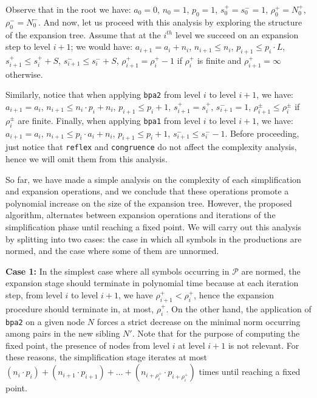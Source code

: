 Observe that in the root we have: $a_0=0$, $n_0=1$, $p_0=1$,
$s_0^+=s_0^-=1$, $\rho_0^+=N_0^+$, $\rho_0^-=N_0^-$. And now, let us proceed
with this analysis by exploring the structure of the expansion tree. Assume 
that at the $i^{th}$ level we succeed on an expansion step to
level $i+1$;
we would have: $a_{i+1}=a_i+n_i$, $n_{i+1}\leq n_i$, 
$p_{i+1}\leq p_i\cdot L$,
$s_{i+1}^+\leq s_i^++S$, $s_{i+1}^-\leq s_i^-+S$, $\rho_{i+1}^+=\rho_i^+-1$ 
if $\rho_i^+$ is finite and  $\rho_{i+1}^+ = \infty$ otherwise.

Similarly, notice that when applying \lstinline{bpa2} from level $i$
to level $i+1$, we have: $a_{i+1}=a_i$, $n_{i+1} \leq n_i\cdot p_i + n_i$,
$p_{i+1} \leq p_i+1$, $s_{i+1}^+=s_i^+$, $s_{i+1}^-=1$, 
$\rho_{i+1}^\pm\leq \rho_i^\pm$ if $\rho_i^\pm$ are finite. 
Finally, when applying \lstinline{bpa1} from level $i$
to level $i+1$, we have: $a_{i+1}=a_i$, $n_{i+1} \leq p_i \cdot a_i+n_i$,
$p_{i+1}\leq p_i+1$, $s_{i+1}^- \leq s_i^- - 1$.
Before proceeding, just notice that \lstinline{reflex} and 
\lstinline{congruence} do not affect the complexity analysis, hence 
we will omit them from this analysis.

So far, we have made a simple analysis on the complexity of each 
simplification and expansion operations, and we conclude that
these operations promote a polynomial increase on the size of the
expansion tree. 
However, the proposed algorithm, alternates between expansion 
operations and iterations of the simplification phase until 
reaching a fixed point. We will carry out this analysis by 
splitting into two cases: the case in which all symbols 
in the productions are normed, and the case where some
of them are unnormed.\smallskip

\noindent\textbf{Case 1:} In the simplest case where all symbols
occurring in $\mathcal{P}$ are normed, the expansion stage should 
terminate in polynomial time because at each iteration step, from level 
$i$ to level $i+1$, we have $\rho_{i+1}^+ < \rho_i^+$, 
hence the expansion procedure should terminate in, at most, $\rho_i^+$.
On the other hand, the application of \lstinline{bpa2} 
on a given node $N$ forces a strict decrease on the minimal
norm occurring among pairs in the new sibling $N'$. 
Note that for the purpose of computing the fixed point, the
presence of nodes from level $i$ at level $i+1$ is not relevant.
For these reasons, the simplification stage iterates at most 
$(n_i\cdot p_i)+ (n_{i+1}\cdot p_{i+1}) +
\ldots + (n_{i+\rho_i^+}\cdot p_{i+\rho_i^+})$ 
times until reaching a fixed point. \smallskip

